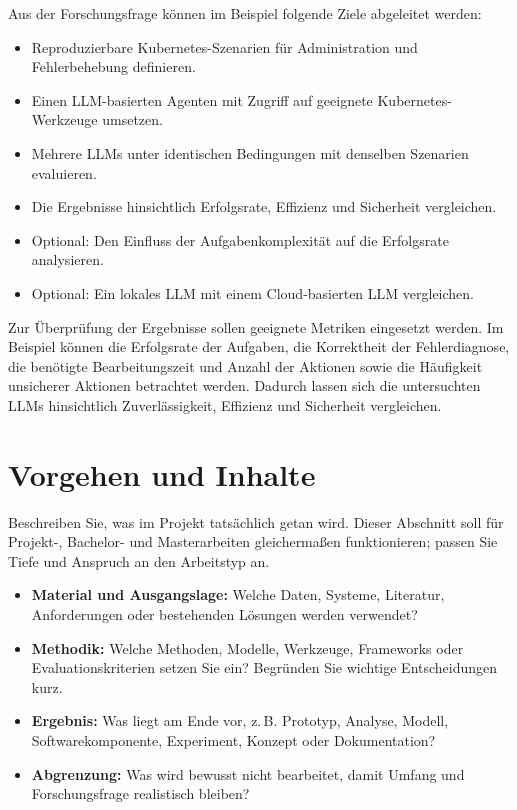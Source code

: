 \documentclass[a4paper, 11pt]{scrartcl}
\begin{document}
Aus der Forschungsfrage können im Beispiel folgende Ziele abgeleitet werden:

\begin{itemize}
  \item Reproduzierbare Kubernetes-Szenarien für Administration und Fehlerbehebung definieren.
  \item Einen LLM-basierten Agenten mit Zugriff auf geeignete Kubernetes-Werkzeuge umsetzen.
  \item Mehrere LLMs unter identischen Bedingungen mit denselben Szenarien evaluieren.
  \item Die Ergebnisse hinsichtlich Erfolgsrate, Effizienz und Sicherheit vergleichen.
  \item Optional: Den Einfluss der Aufgabenkomplexität auf die Erfolgsrate analysieren.
  \item Optional: Ein lokales LLM mit einem Cloud-basierten LLM vergleichen.
\end{itemize}

Zur Überprüfung der Ergebnisse sollen geeignete Metriken eingesetzt werden. Im Beispiel können die Erfolgsrate der Aufgaben, die Korrektheit der Fehlerdiagnose, die benötigte Bearbeitungszeit und Anzahl der Aktionen sowie die Häufigkeit unsicherer Aktionen betrachtet werden. Dadurch lassen sich die untersuchten LLMs hinsichtlich Zuverlässigkeit, Effizienz und Sicherheit vergleichen.

\section*{Vorgehen und Inhalte}
Beschreiben Sie, was im Projekt tatsächlich getan wird. Dieser Abschnitt soll für Projekt-, Bachelor- und Masterarbeiten gleichermaßen funktionieren; passen Sie Tiefe und Anspruch an den Arbeitstyp an.

\begin{itemize}
  \item \textbf{Material und Ausgangslage:} Welche Daten, Systeme, Literatur, Anforderungen oder bestehenden Lösungen werden verwendet?
  \item \textbf{Methodik:} Welche Methoden, Modelle, Werkzeuge, Frameworks oder Evaluationskriterien setzen Sie ein? Begründen Sie wichtige Entscheidungen kurz.
  \item \textbf{Ergebnis:} Was liegt am Ende vor, z.\,B. Prototyp, Analyse, Modell, Softwarekomponente, Experiment, Konzept oder Dokumentation?
  \item \textbf{Abgrenzung:} Was wird bewusst nicht bearbeitet, damit Umfang und Forschungsfrage realistisch bleiben?
\end{itemize}
\end{document}

